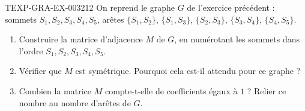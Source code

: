 \begin{exercice}{TEXP-GRA-EX-003}{2}{12}
On reprend le graphe $G$ de l'exercice précédent : sommets $S_1,S_2,S_3,S_4,S_5$, arêtes $\{S_1,S_2\}$, $\{S_1,S_3\}$, $\{S_2,S_3\}$, $\{S_3,S_4\}$, $\{S_4,S_5\}$.
\begin{enumerate}
  \item Construire la matrice d'adjacence $M$ de $G$, en numérotant les sommets dans l'ordre $S_1,S_2,S_3,S_4,S_5$.
  \item Vérifier que $M$ est symétrique. Pourquoi cela est-il attendu pour ce graphe ?
  \item Combien la matrice $M$ compte-t-elle de coefficients égaux à $1$ ? Relier ce nombre au nombre d'arêtes de $G$.
\end{enumerate}
\end{exercice}

